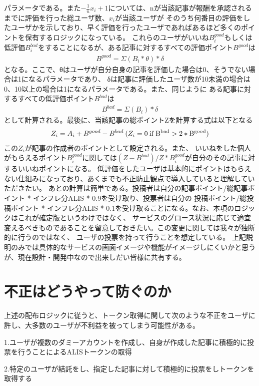 \documentclass{jsarticle}
\begin{document}
パラメータである。また$-\frac{1}{n}x_{i}+1$については、nが当該記事が報酬を承認されるまでに評価を行った総ユーザ数、$x_{i}$が当該ユーザが
そのうち何番目の評価をしたユーザかを示しており、早く評価を行ったユーザであればあるほど多くのポイントを保有するロジックになっている。
これらのユーザがいいね$B^{good}_{i}$もしくは低評価$B^{bad}_{i}$をすることになるが、ある記事に対するすべての評価ポイント$B^{good}$は
\begin{align}
B^{good} = Σ (B_{i} * θ)  * δ 
\end{align}
となる。ここで、θはユーザが自分自身の記事を評価した場合は0、そうでない場合は1になるパラメータであり、
δは記事に評価したユーザ数が10未満の場合は0、10以上の場合は1になるパラメータである。また、同じように
ある記事に対するすべての低評価ポイント$B^{bad}$は
\begin{align}
B^{bad} = Σ (B_{i}) * δ
\end{align}
として計算される。最後に、当該記事の総ポイントZを計算する式は以下となる
\begin{align}
Z_{i} = A_{i} + B^{good} - B^{bad}\:( Z_{i} = 0 \rm \:if\: B^{bad} > 2*B^{good})
\end{align}
この$Z_{i}$が記事の作成者のポイントとして設定される。また、
いいねをした個人がもらえるポイント$B^{good}_{i}$に関しては$(Z - B^{bad}) / Z * B^{good}_{i}$が自分のその記事に対するいいねポイントになる。
低評価をしたユーザは基本的にポイントはもらえない仕組みになっており、あくまでも不正防止観点で導入していると理解していただきたい。
あとの計算は簡単である。投稿者は自分の記事ポイント/総記事ポイント * インフレ分ALIS * 0.9を受け取り、投票者は自分の
投稿ポイント/総投稿ポイント * インフレ分ALIS * 0.1を受け取ることになる。なお、本項のロジックはこれが確定版というわけではなく、
サービスのグロース状況に応じて適宜変えるべきものであることを留意しておきたい。この変更に関しては我々が独断的に行うのではなく、
ユーザの投票を持って行うことを想定している。
上記説明のみでは具体的なサービスの画面イメージや機能がイメージしにくいかと思うが、現在設計・開発中なので出来しだい皆様に共有する。
\section{不正はどうやって防ぐのか}
上述の配布ロジックに従うと、トークン取得に関して次のような不正をユーザに許し、大多数のユーザが不利益を被ってしまう可能性がある。

1.ユーザが複数のダミーアカウントを作成し、自身が作成した記事に積極的に投票を行うことによるALISトークンの取得

2.特定のユーザが結託をし、指定した記事に対して積極的に投票をしトークンを取得する
\end{document}
